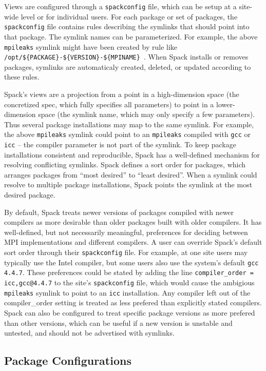Views are configured through a {\tt spackconfig} file, which can be setup at a site-wide level or for individual users.
For each package or set of packages, the {\tt spackconfig} file contains rules
describing the symlinks that should point into that package.
The symlink names can be parameterized.
For example, the above {\tt mpileaks} symlink might have been created by rule like
{\tt /opt/\$\{PACKAGE\}-\$\{VERSION\}-\$\{MPINAME\} }.
When Spack installs or removes packages,
symlinks are automaticaly created, deleted, or updated according to these rules.  

Spack's views are a projection from a point in a high-dimension space
(the concretized spec, which fully specifies all parameters) to point in a lower-dimension space
(the symlink name, which may only specify a few parameters).
Thus several package installations may map to the same symlink.
For example, the above {\tt mpileaks} symlink could point to an {\tt mpileaks} compiled with
{\tt gcc} or {\tt icc} -- the compiler parameter is not part of the symlink.
To keep  package installations  consistent and reproducible,
Spack has a well-defined mechanism for resolving conflicting symlinks.
Spack defines a sort order for packages, which arranges packages from ``most desired'' to ``least desired''.
When a symlink could resolve to multiple package installations,
Spack points the symlink at the most desired package.  

By default, Spack treats newer versions of packages compiled with newer compilers
as more desirable than older packages built with older compilers.
It has well-defined, but not necessarily meaningful,
preferences for deciding between MPI implementations and different compilers.
A user can override Spack's default sort order through their {\tt spackconfig} file.
For example, at one site users may typically use the Intel compiler,
but some users also use the system's default {\tt gcc 4.4.7}.
These preferences could be stated by adding the line
{\tt compiler\_order = icc,gcc@4.4.7} to the site's {\tt spackconfig} file,
which would cause the ambigious {\tt mpileaks} symlink to point to an {\tt icc} installation.
Any compiler left out of the compiler\_order setting is treated as less prefered than explicitly stated compilers.
Spack can also be configured to treat specific package versions as more prefered than other versions,
which can be useful if a new version is unstable and untested, and should not be advertised with symlinks.  


\subsection{Package Configurations}

